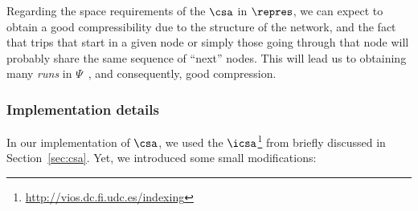 
Regarding the space requirements of the $\csa$ in $\repres$, we can expect to obtain a good compressibility
due to the structure of the network, and the fact that trips that start in a given node or simply
those going through that node will probably share the same sequence of ``next'' nodes. This will
lead us to obtaining many {\em runs} in $\Psi$~\cite{NM07}, and consequently, good compression.

\subsubsection{Implementation details} In our implementation of $\csa$, we used the 
$\icsa$\footnote{\url{http://vios.dc.fi.udc.es/indexing}} from \cite{FBNCPR12} briefly discussed 
in Section~\ref{sec:csa}. Yet, we introduced some small modifications:

